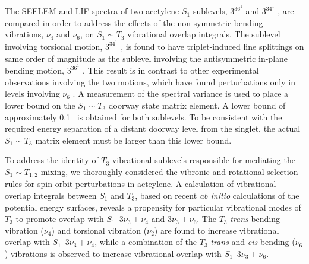 \documentclass[12pt]{mitthesis}
\begin{document}
The SEELEM and LIF spectra of two acetylene $S_1$ sublevels, $3^36^1$
 and $3^34^1$ , are compared in order to address the
effects of the non-symmetric bending vibrations, $\nu_4$ and $\nu_6$,
on $S_1 \sim T_3$ vibrational overlap integrals.  The sublevel
involving torsional motion, $3^34^1$ , is found to have
triplet-induced line splittings on same order of magnitude as the
sublevel involving the antisymmetric in-plane bending motion, $3^36^1$
.  This result is in contrast to other experimental observations
involving the two motions, which have found perturbations only in
levels involving $\nu_6$ \cite{mizoguchi00, yamakita01}.  A
measurement of the spectral variance is used to place a lower bound on
the $S_1 \sim T_3$ doorway state matrix element.  A lower bound of
approximately 0.1 \rcm\ is obtained for both sublevels.  To be
consistent with the required energy separation of a distant doorway
level from the singlet, the actual $S_1 \sim T_3$ matrix element must
be larger than this lower bound.

To address the identity of $T_3$ vibrational sublevels responsible for
mediating the $S_1 \sim T_{1,2}$ mixing, we thoroughly considered the
vibronic and rotational selection rules for spin-orbit perturbations
in acteylene.  A calculation of vibrational overlap integrals between
$S_1$ and $T_3$, based on recent \emph{ab initio} calculations of the
potential energy surfaces, reveals a propensity for particular
vibrational modes of $T_3$ to promote overlap with $S_1 \:\; 3\nu_3 +
\nu_4$ and $3\nu_3 + \nu_6$.  The $T_3$ \emph{trans}-bending
vibration ($\nu_4$) and torsional vibration ($\nu_2$) are found to
increase vibrational overlap with $S_1 \:\; 3\nu_3 + \nu_4$, while a
combination of the $T_3$ \emph{trans} and \emph{cis}-bending ($\nu_6$)
vibrations is observed to increase vibrational overlap with $S_1 \:\;
3\nu_3 + \nu_6$.
\end{document}

